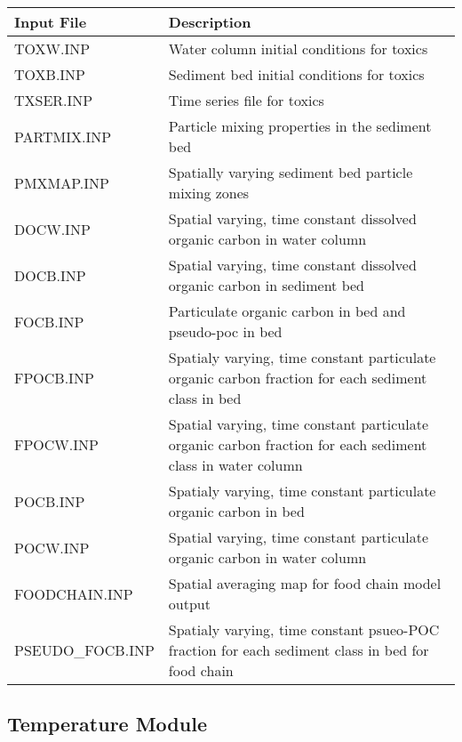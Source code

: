 \documentclass[letterpaper,10pt,english]{sphinxmanual}
\begin{document}
\begin{savenotes}\sphinxattablestart
\centering
\begin{tabulary}{\linewidth}[t]{|T|T|}
\hline
\sphinxstyletheadfamily 
Input File
&\sphinxstyletheadfamily 
Description
\\
\hline
TOXW.INP
&
Water column initial conditions for toxics
\\
\hline
TOXB.INP
&
Sediment bed initial conditions for toxics
\\
\hline
TXSER.INP
&
Time series file for toxics
\\
\hline
PARTMIX.INP
&
Particle mixing properties in the sediment bed
\\
\hline
PMXMAP.INP
&
Spatially varying sediment bed particle mixing zones
\\
\hline
DOCW.INP
&
Spatial varying, time constant dissolved organic carbon in water column
\\
\hline
DOCB.INP
&
Spatial varying, time constant dissolved organic carbon in sediment bed
\\
\hline
FOCB.INP
&
Particulate organic carbon in bed and pseudo-poc in bed
\\
\hline
FPOCB.INP
&
Spatialy varying, time constant particulate organic carbon fraction for each sediment class in bed
\\
\hline
FPOCW.INP
&
Spatial varying, time constant particulate organic carbon fraction for each sediment class in water column
\\
\hline
POCB.INP
&
Spatialy varying, time constant particulate organic carbon in bed
\\
\hline
POCW.INP
&
Spatial varying, time constant particulate organic carbon in water column
\\
\hline
FOODCHAIN.INP
&
Spatial averaging map for food chain model output
\\
\hline
PSEUDO\_FOCB.INP
&
Spatialy varying, time constant psueo-POC fraction for each sediment class in bed for food chain
\\
\hline
\end{tabulary}
\par
\sphinxattableend\end{savenotes}


\subsection{Temperature Module}
\label{\detokenize{inputfiles/temperature:temperature-module}}\label{\detokenize{inputfiles/temperature:temperature}}\label{\detokenize{inputfiles/temperature::doc}}
\end{document}
